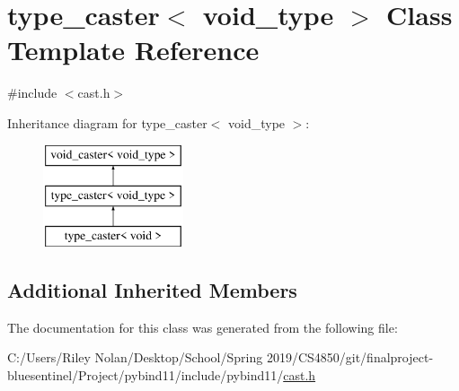 \hypertarget{classtype__caster_3_01void__type_01_4}{}\section{type\+\_\+caster$<$ void\+\_\+type $>$ Class Template Reference}
\label{classtype__caster_3_01void__type_01_4}


{\ttfamily \#include $<$cast.\+h$>$}

Inheritance diagram for type\+\_\+caster$<$ void\+\_\+type $>$\+:\begin{figure}[H]
\begin{center}
\leavevmode
\includegraphics[height=3.000000cm]{classtype__caster_3_01void__type_01_4}
\end{center}
\end{figure}
\subsection*{Additional Inherited Members}


The documentation for this class was generated from the following file\+:\begin{DoxyCompactItemize}
\item 
C\+:/\+Users/\+Riley Nolan/\+Desktop/\+School/\+Spring 2019/\+C\+S4850/git/finalproject-\/bluesentinel/\+Project/pybind11/include/pybind11/\mbox{\hyperlink{cast_8h}{cast.\+h}}\end{DoxyCompactItemize}

